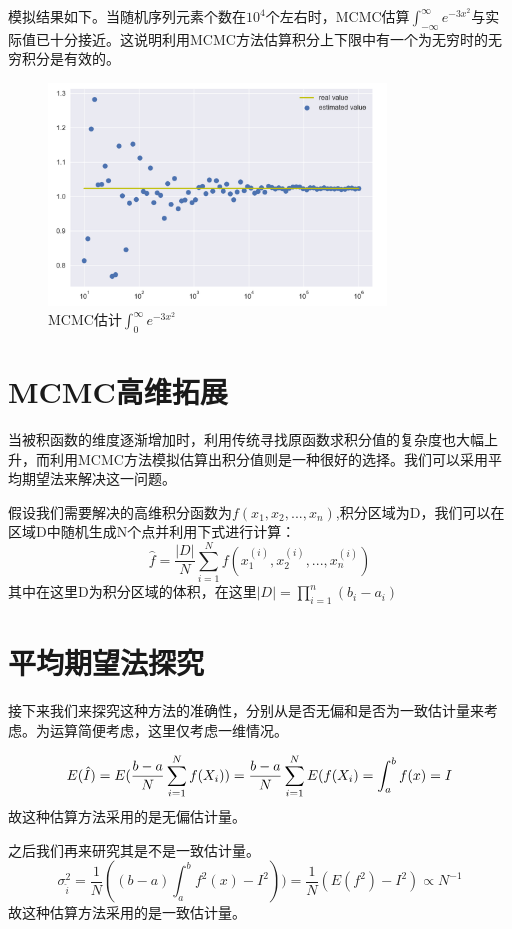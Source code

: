 \documentclass[paper=a4, fontsize=11pt]{scrartcl} %
\numberwithin{equation}{section} %
\numberwithin{figure}{section} %
\numberwithin{table}{section} %
\begin{document}
模拟结果如下。当随机序列元素个数在$10^{4}$个左右时，MCMC估算$\int_{-\infty}^{\infty}e^{-3x^2}$与实际值已十分接近。这说明利用MCMC方法估算积分上下限中有一个为无穷时的无穷积分是有效的。
\begin{figure}[H]
	\centering
	\includegraphics[width = 0.8\textwidth]{ban.png}
	\caption{MCMC估计$\int_{0}^{\infty}e^{-3x^2}$}
\end{figure}

\section{MCMC高维拓展}
当被积函数的维度逐渐增加时，利用传统寻找原函数求积分值的复杂度也大幅上升，而利用MCMC方法模拟估算出积分值则是一种很好的选择。我们可以采用平均期望法来解决这一问题。

假设我们需要解决的高维积分函数为$f(x_{1},x_{2},...,x_{n})$,积分区域为D，我们可以在区域D中随机生成N个点并利用下式进行计算：
\begin{equation}
	\hat{f} = \dfrac{|D|}{N}\sum_{i=1}^{N}f(x_{1}^{(i)},x_{2}^{(i)},...,x_{n}^{(i)})
\end{equation}
其中在这里D为积分区域的体积，在这里$|D| = \prod_{i = 1}^{n}(b_{i}-a_{i})$

\section{平均期望法探究}
接下来我们来探究这种方法的准确性，分别从是否无偏和是否为一致估计量来考虑。为运算简便考虑，这里仅考虑一维情况。

\begin{equation}
\centering
E(\hat{I}) = E(	\frac{b-a}{N}\sum_{i=1}^{N}f(X_{i}) )= \frac{b-a}{N}\sum_{i=1}^{N}E(f(X_{i}) = \int_{a}^{b}f(x) = I
\end{equation}
故这种估算方法采用的是无偏估计量。

之后我们再来研究其是不是一致估计量。
\begin{equation}
	\sigma_{\hat{i}}^{2} = \frac{1}{N}((b-a)\int_{a}^{b}f^{2}(x)-I^2)) = \frac{1}{N}(E(f^{2})-I^{2})\propto N^{-1}
\end{equation}
故这种估算方法采用的是一致估计量。
\end{document}
